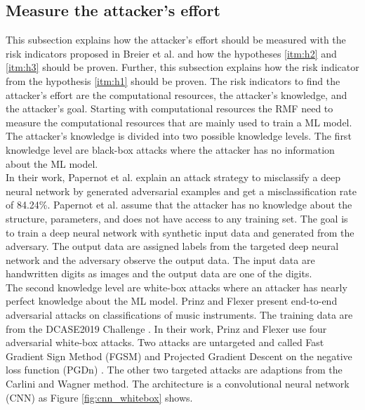 \subsection{Measure the attacker's effort}
\label{sec:find_effort}

This subsection explains how the attacker's effort should be measured with the risk indicators proposed in Breier et al. \cite{DBLP:journals/corr/abs-2012-04884} and how the hypotheses \ref{itm:h2} and
\ref{itm:h3} should be proven. Further, this subsection explains how the risk indicator from the hypothesis \ref{itm:h1} should be proven. The risk indicators to find the attacker's effort are the
computational resources, the attacker's knowledge, and the attacker's goal. Starting with computational resources the RMF need to measure the computational resources that are mainly used to train a ML
model. The attacker's knowledge is divided into two possible knowledge levels. The first knowledge level are black-box attacks where the attacker has no information about the ML model. \\ In their
work, Papernot et al. \cite{DBLP:conf/ccs/PapernotMGJCS17} explain an attack strategy to misclassify a deep neural network by generated adversarial examples and get a misclassification rate of 84.24\%.
Papernot et al. assume that the attacker has no knowledge about the structure, parameters, and does not have access to any training set. The goal is to train a deep neural network with synthetic input
data and generated from the adversary. The output data are assigned labels from the targeted deep neural network and the adversary observe the output data. The input data are handwritten digits as
images and the output data are one of the digits. \\ The second knowledge level are white-box attacks where an attacker has nearly perfect knowledge about the ML model. Prinz and Flexer
\cite{DBLP:journals/corr/abs-2007-14714} present end-to-end adversarial attacks on classifications of music instruments. The training data are from the DCASE2019 Challenge \cite{DBLP:conf/dcase/
FonsecaPFES19}. In their work, Prinz and Flexer use four adversarial white-box attacks. Two attacks are untargeted
and called Fast Gradient Sign Method (FGSM) \cite{DBLP:journals/corr/GoodfellowSS14} and Projected Gradient Descent on the negative loss function (PGDn) \cite{DBLP:conf/iclr/MadryMSTV18}. The other two
targeted attacks are adaptions from the  Carlini and Wagner \cite{DBLP:conf/sp/Carlini018} method. The architecture is a convolutional neural network (CNN) as Figure \ref{fig:cnn_whitebox} shows.

